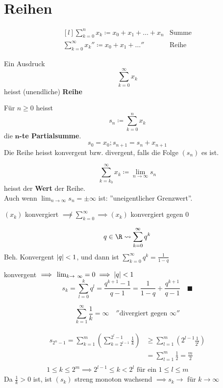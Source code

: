 \section{Reihen}
\[\begin{matrix*}[l]
	\sum_{k=0}^n x_k \coloneqq x_0 + x_1 + \dots + x_n	&\text{Summe}	\\
	\sum_{k=0}^\infty x_k ''\coloneqq x_0 + x_1 + \dots''	&\text{Reihe}	
\end{matrix*}\]

\begin{def*}[note = Reihe , index = Reihe]
	Ein Ausdruck
	\[ \sum_{k=0}^\infty x_k \]
	heisst (unendliche) \textbf{Reihe}
\end{def*}
\begin{def*}[note = Partialsumme , index = Partialsumme]
	Für $n \geq 0$ heisst
	\[ s_n \coloneqq \sum_{k=0}^n x_k \]
	die \textbf{$\mathbf{n}$-te Partialsumme}.
	\[ s_0 = x_0 ; s_{n+1} = s_n + x_{n+1} \]
	Die Reihe heisst konvergent bzw. divergent, falls die Folge $(s_n)$ es ist.
\end{def*}
\begin{def*}[note = Wert , index = Reihe!Wert]
	\[ \sum_{k=k_0}^\infty x_k \coloneqq \lim_{n \rightarrow \infty} s_n \]
	heisst der \textbf{Wert} der Reihe. \\
	Auch wenn $\lim_{n \rightarrow \infty} s_n = \pm \infty$ ist: ''uneigentlicher Grenzwert''.
\end{def*}
\begin{bem}
	$(x_k)$ konvergiert $\not\implies \sum_{k=0}^\infty \implies (x_k)$ konvergiert gegen $0$ \quad [Da $x_k = s_k - s_{k-1}$]
\end{bem}
\begin{bsp*}
	\[ q \in \R \rightsquigarrow \sum_{k=0}^\infty q^k \]
	Beh. Konvergent \gdw $\abs{q} < 1$, und dann ist $\sum_{k=0}^\infty q^k = \frac{1}{1-q}$ \\
	\begin{bew}
		konvergent $\implies \lim_{k \rightarrow \infty} = 0 \implies \abs{q} < 1$
		\[ s_k = \sum_{l=0}^k q^l = \frac{q^{k+1} - 1}{q-1} = \frac{1}{1-q} + \frac{q^{k+1}}{q-1} \quad \blacksquare \]
	\end{bew}
\end{bsp*}
\begin{bsp*}[note = Harmonische Reihe]
	\[ \sum_{k=1}^\infty \frac{1}{k} = \infty \quad ''\text{divergiert gegen } \infty '' \]
	\begin{bew}
		 \begin{gather*}
		 	\begin{split}
				s_{2^n-1} = \sum_{k=1}^m \left( \sum_{k=2^{l-1}}^{2^l - 1} \frac{1}{k} \right)	&\geq \sum_{l=1}^m \left( 2^{l-1} \frac{1}{2^l} \right) \\
																		&= \sum_{l=1}^m \frac{1}{2} = \frac{m}{2}
			\end{split} \\
			 1 \leq k \leq 2^m \implies 2^{l-1} \leq k < 2^l \text{ für ein } 1 \leq l \leq m
		\end{gather*}
		Da $\frac{1}{k} > 0$ ist, ist $(s_k)$ streng monoton wachsend $\implies s_k \rightarrow$ für $k \rightarrow \infty$
	\end{bew}
\end{bsp*}
